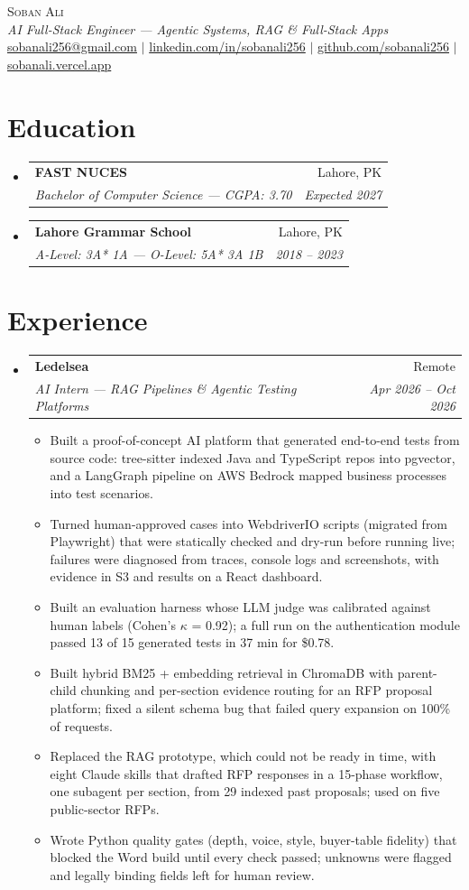 \documentclass[letterpaper,10pt]{article}
\makeatletter
\newcommand{\resumeItem}[1]{
  \item\small{{#1 \vspace{-2pt}}}
}
\newcommand{\resumeSubheading}[4]{
  \vspace{-2pt}\item
    \begin{tabular*}{0.97\textwidth}[t]{l@{\extracolsep{\fill}}r}
      \textbf{#1} & #2 \\
      \textit{\small#3} & \textit{\small #4} \\
    \end{tabular*}\vspace{-7pt}
}
\newcommand{\resumeSubHeadingListStart}{\begin{itemize}[leftmargin=0.15in, label={}]}
\newcommand{\resumeSubHeadingListEnd}{\end{itemize}}
\newcommand{\resumeItemListStart}{\begin{itemize}}
\newcommand{\resumeItemListEnd}{\end{itemize}\vspace{-5pt}}
\makeatother
\begin{document}
\begin{center}
  {\Huge \scshape Soban Ali} \\ \vspace{3pt}
  {\normalsize \textit{AI Full-Stack Engineer --- Agentic Systems, RAG \& Full-Stack Apps}} \\ \vspace{3pt}
  \small \href{mailto:sobanali256@gmail.com}{sobanali256@gmail.com} $|$
  \href{https://linkedin.com/in/sobanali256}{linkedin.com/in/sobanali256} $|$
  \href{https://github.com/sobanali256}{github.com/sobanali256} $|$
  \href{https://sobanali.vercel.app}{sobanali.vercel.app}
\end{center}

\section{Education}
\resumeSubHeadingListStart
  \resumeSubheading
    {FAST NUCES}{Lahore, PK}
    {Bachelor of Computer Science \textnormal{--- CGPA: 3.70}}{Expected 2027}
  \resumeSubheading
    {Lahore Grammar School}{Lahore, PK}
    {A-Level: 3A* 1A \textnormal{---} O-Level: 5A* 3A 1B}{2018 -- 2023}
\resumeSubHeadingListEnd

\section{Experience}
\resumeSubHeadingListStart
  \resumeSubheading
    {Ledelsea}{Remote}
    {AI Intern --- RAG Pipelines \& Agentic Testing Platforms}{Apr 2026 -- Oct 2026}
    \resumeItemListStart
      \resumeItem{Built a proof-of-concept AI platform that generated end-to-end tests from source code: tree-sitter indexed Java and TypeScript repos into pgvector, and a LangGraph pipeline on AWS Bedrock mapped business processes into test scenarios.}
      \resumeItem{Turned human-approved cases into WebdriverIO scripts (migrated from Playwright) that were statically checked and dry-run before running live; failures were diagnosed from traces, console logs and screenshots, with evidence in S3 and results on a React dashboard.}
      \resumeItem{Built an evaluation harness whose LLM judge was calibrated against human labels (Cohen's $\kappa$ = 0.92); a full run on the authentication module passed 13 of 15 generated tests in 37 min for \$0.78.}
      \resumeItem{Built hybrid BM25 + embedding retrieval in ChromaDB with parent-child chunking and per-section evidence routing for an RFP proposal platform; fixed a silent schema bug that failed query expansion on 100\% of requests.}
      \resumeItem{Replaced the RAG prototype, which could not be ready in time, with eight Claude skills that drafted RFP responses in a 15-phase workflow, one subagent per section, from 29 indexed past proposals; used on five public-sector RFPs.}
      \resumeItem{Wrote Python quality gates (depth, voice, style, buyer-table fidelity) that blocked the Word build until every check passed; unknowns were flagged and legally binding fields left for human review.}
    \resumeItemListEnd
\resumeSubHeadingListEnd
\end{document}

